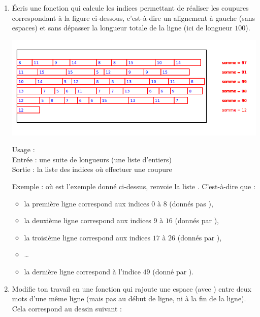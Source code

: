 \documentclass[11pt,class=report,crop=false]{standalone}
\begin{document}
\begin{activite}[Justification]
\begin{enumerate}
  \item Écris une fonction  qui calcule les indices permettant de réaliser les coupures correspondant à la figure ci-dessous, c'est-à-dire un alignement à gauche (sans espaces) et sans dépasser la longueur totale de la ligne (ici de longueur $100$).
  
\begin{center}
\includegraphics[scale=0.5]{ecran-coupures-2}
\end{center} 

  \begin{fonction}
  Usage :  \\
  Entrée : une suite de longueurs (une liste d'entiers)\\
  Sortie : la liste des indices où effectuer une coupure
  \medskip
    
  Exemple :  où  est l'exemple donné ci-dessus, renvoie la liste \ci{[0, 9, 17, 27, 39, 49, 50]}. C'est-à-dire que :
  \begin{itemize}
    \item la première ligne correspond aux indices $0$ à $8$ (donnés pas ),
    \item la deuxième ligne  correspond aux indices $9$ à $16$ (donnés par ),
    \item la troisième ligne correspond aux indices $17$ à $26$ (donnés par ),
    \item \ldots
    \item la dernière ligne correspond à l'indice $49$ (donné par ).
    \end{itemize}
             
  \end{fonction}

  \item Modifie ton travail en une fonction  qui rajoute une espace (avec ) entre deux mots d'une même ligne (mais pas au début de ligne, ni à la fin de la ligne). Cela correspond au dessin suivant :
  

\end{enumerate}
\end{activite}
\end{document}
